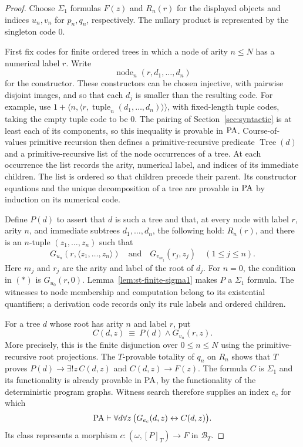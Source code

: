 \begin{proof}
Choose $\Sigma_1$ formulas $F(z)$ and $R_n(r)$ for the displayed
objects and indices $u_n,v_n$ for $p_n,q_n$, respectively.
The nullary product is represented by the singleton code $0$.

First fix codes for finite ordered trees in which a node of arity
$n\leq N$ has a numerical label $r$.  Write
\[
 \operatorname{node}_n(r,d_1,\ldots,d_n)
\]
for the constructor.  These constructors can be chosen injective,
with pairwise disjoint images, and so that each $d_j$ is smaller
than the resulting code.  For example, use
$1+\langle n,\langle r,\operatorname{tuple}_n(d_1,\ldots,d_n)
\rangle\rangle$, with fixed-length tuple codes, taking the empty
tuple code to be $0$.  The pairing of Section~\ref{sec:syntactic}
is at least each of its components, so this inequality is provable
in $\mathrm{PA}$.
Course-of-values primitive recursion then defines a
primitive-recursive predicate $\operatorname{Tree}(d)$ and a
primitive-recursive list of the node occurrences of a tree.  At
each occurrence the list records the arity, numerical label, and
indices of its immediate children.  The list is ordered so that
children precede their parent.  Its constructor equations and
the unique decomposition of a tree are provable in $\mathrm{PA}$ by
induction on its numerical code.

Define $P(d)$ to assert that $d$ is such a tree and that, at every
node with label $r$, arity $n$, and immediate subtrees
$d_1,\ldots,d_n$, the following hold: $R_n(r)$, and there is an
$n$-tuple $(z_1,\ldots,z_n)$ such that
\[
 G_{u_n}(r,\langle z_1,\ldots,z_n\rangle)
 \quad\text{and}\quad
 G_{v_{m_j}}(r_j,z_j)\quad(1\leq j\leq n).
 \tag{\(*\)}
\]
Here $m_j$ and $r_j$ are the arity and label of the root of
$d_j$.  For $n=0$, the condition in \((*)\) is
$G_{u_0}(r,0)$.
Lemma~\ref{lem:st-finite-sigma1} makes $P$ a $\Sigma_1$
formula. The witnesses to node membership and computation belong
to its existential quantifiers; a derivation code records only
its rule labels and ordered children.

For a tree $d$ whose root has arity $n$ and label $r$, put
\[
 C(d,z)\ \equiv\ P(d)\land G_{v_n}(r,z).
\]
More precisely, this is the finite disjunction over $0\leq n\leq N$
using the primitive-recursive root projections.
The $T$-provable totality of $q_n$ on $R_n$ shows that
$T$ proves $P(d)\to\exists!z\,C(d,z)$ and
$C(d,z)\to F(z)$.
The formula $C$ is $\Sigma_1$ and its functionality is already
provable in $\mathrm{PA}$, by the functionality of the deterministic
program graphs.  Witness search therefore supplies an index
$e_c$ for which
\[
 \mathrm{PA}\vdash\forall d\forall z\,
             \bigl(G_{e_c}(d,z)\leftrightarrow C(d,z)\bigr).
\]
Its class represents a morphism $c:(\omega,[P]_T)\to F$ in
$\mathcal B_T$.


\end{proof}
